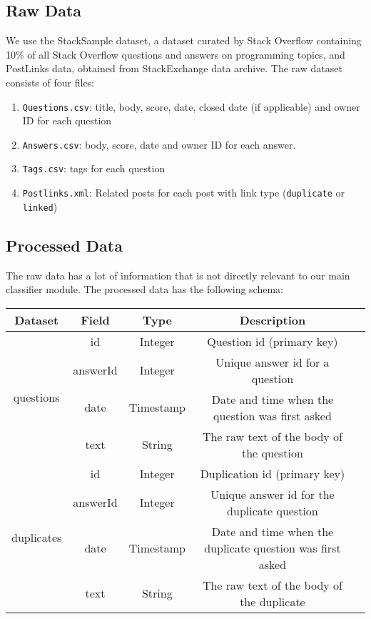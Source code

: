 \documentclass{article}
\begin{document}
\subsection{Raw Data}
We use the StackSample\cite{dataset} dataset, a dataset curated by Stack Overflow containing 10\% of all Stack Overflow questions and answers on programming topics, and PostLinks data, obtained from StackExchange data archive. The raw dataset consists of four files:
\begin{enumerate}
	\item \texttt{Questions.csv}: title, body, score, date, closed date (if applicable) and owner ID for each question
	\item \texttt{Answers.csv}: body, score, date and owner ID for each answer.
	\item \texttt{Tags.csv}: tags for each question
	\item \texttt{Postlinks.xml}: Related posts for each post with link type (\texttt{duplicate} or \texttt{linked})
\end{enumerate}

\subsection{Processed Data}
The raw data has a lot of information that is not directly relevant to our main classifier module. The processed data has the following schema:

\begin{center}
	\begin{tabular}{ |c|c|c|c|c| } 
		\hline
		Dataset & Field & Type & Description \\
		\hline
		\multirow{4}{4em}{questions} & id & Integer & Question id (primary key) \\ 
		& answerId & Integer & Unique answer id for a question \\ 
		& date & Timestamp & Date and time when the question was first asked \\ 
		& text & String & The raw text of the body of the question \\
		\hline
		\multirow{4}{4em}{duplicates} & id & Integer & Duplication id (primary key) \\ 
		& answerId & Integer & Unique answer id for the duplicate question \\ 
		& date & Timestamp & Date and time when the duplicate question was first asked \\ 
		& text & String & The raw text of the body of the duplicate \\
		\hline
	\end{tabular}
\end{center}
\end{document}
